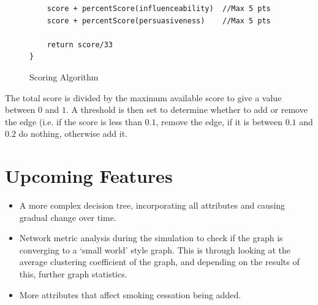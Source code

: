 \documentclass[]{article}
\begin{document}
\begin{enumerate}
\begin{figure}[h]
\begin{center}
\begin{lstlisting}
	score + percentScore(influenceability)	//Max 5 pts
	score + percentScore(persuasiveness)	//Max 5 pts

	return score/33
}
	\end{lstlisting}
\end{center}
\label{pseudo}
\caption{Scoring Algorithm}
\end{figure}
The total score is divided by the maximum available score to give a value between $0$ and $1$. A threshold is then set to determine whether to add or remove the edge (i.e. if the score is less than $0.1$, remove the edge, if it is between $0.1$ and $0.2$ do nothing, otherwise add it.

\end{enumerate}
\section{Upcoming Features}
\begin{itemize}
\item A more complex decision tree, incorporating all attributes and causing gradual change over time.
\item Network metric analysis during the simulation to check if the graph is converging to a `small world' style graph. This is through looking at the average clustering coefficient of the graph, and depending on the results of this, further graph statistics.
\item More attributes that affect smoking cessation being added.
\end{itemize}
\end{document}
